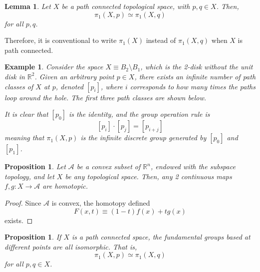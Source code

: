 \documentclass{article}
\newtheorem{proposition}[theorem]{Proposition}
\newtheorem{lemma}[theorem]{Lemma}
\newtheorem{example}{Example}[section]
\theoremstyle{remark}
\theoremstyle{definition}
\begin{document}
\begin{lemma}
Let $X$ be a path connected topological space, with $p, q \in X$. Then, 
\[\pi_1 (X, p) \simeq \pi_1 (X, q)\]
for all $p, q$. 
\end{lemma}

Therefore, it is conventional to write $\pi_1 (X)$ instead of $\pi_1 (X, q)$ when $X$ is path connected. 

\begin{example}
Consider the space $X \equiv B_2 \setminus B_1$, which is the 2-disk without the unit disk in $\mathbb{R}^2$. Given an arbitrary point $p \in X$, there exists an infinite number of path classes of $X$ at $p$, denoted $[p_i]$, where $i$ corresponds to how many times the paths loop around the hole. The first three path classes are shown below. 
\begin{center}
\end{center}
It is clear that $[p_0]$ is the identity, and the group operation rule is
\[[p_i] \cdot [p_j] = [p_{i+j}]\]
meaning that $\pi_1(X, p)$ is the infinite discrete group generated by $[p_0]$ and $[p_1]$. 
\end{example}

\begin{proposition}
Let $\mathcal{A}$ be a convex subset of $\mathbb{R}^n$, endowed with the subspace topology, and let $X$ be any topological space. Then, any 2 continuous maps $f,g: X \longrightarrow \mathcal{A}$ are homotopic. 
\end{proposition}
\begin{proof}
Since $\mathcal{A}$ is convex, the homotopy defined 
\[F(x, t) \equiv (1-t) f(x) + t g(x)\]
exists. 
\end{proof}

\begin{proposition}
If $X$ is a path connected space, the fundamental groups based at different points are all isomorphic. That is, 
\[\pi_1 (X, p) \simeq \pi_1 (X, q)\]
for all $p, q \in X$. 
\end{proposition}
\end{document}

